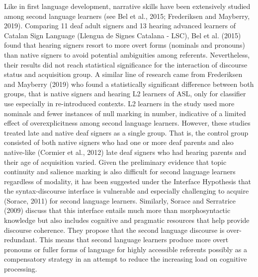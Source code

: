 \documentclass[]{elsarticle} %
\begin{document}
Like in first language development, narrative skills have been
extensively studied among second language learners (see Bel et al.,
2015; Frederiksen and Mayberry, 2019). Comparing 11 deaf adult signers
and 13 hearing advanced learners of Catalan Sign Language (Llengua de
Signes Catalana - LSC), Bel et al. (2015) found that hearing signers
resort to more overt forms (nominals and pronouns) than native signers
to avoid potential ambiguities among referents. Nevertheless, their
results did not reach statistical significance for the interaction of
discourse status and acquisition group. A similar line of research came
from Frederiksen and Mayberry (2019) who found a statistically
significant difference between both groups, that is native signers and
hearing L2 learners of ASL, only for classifier use especially in
re-introduced contexts. L2 learners in the study used more nominals and
fewer instances of null marking in number, indicative of a limited
effect of overexplicitness among second language learners. However,
these studies treated late and native deaf signers as a single group.
That is, the control group consisted of both native signers who had one
or more deaf parents and also native-like (Cormier et al., 2012) late
deaf signers who had hearing parents and their age of acquisition
varied. Given the preliminary evidence that topic continuity and
salience marking is also difficult for second language learners
regardless of modality, it has been suggested under the Interface
Hypothesis that the syntax-discourse interface is vulnerable and
especially challenging to acquire (Sorace, 2011) for second language
learners. Similarly, Sorace and Serratrice (2009) discuss that this
interface entails much more than morphosyntactic knowledge but also
includes cognitive and pragmatic resources that help provide discourse
coherence. They propose that the second language discourse is
over-redundant. This means that second language learners produce more
overt pronouns or fuller forms of language for highly accessible
referents possibly as a compensatory strategy in an attempt to reduce
the increasing load on cognitive processing.
\end{document}
